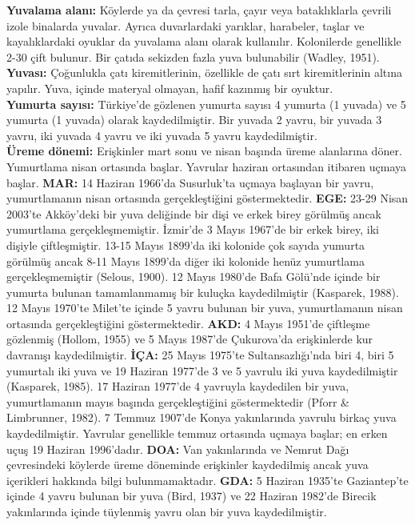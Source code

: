 \documentclass[
  10.5pt,
  a4paper,
  DIV=11,
  numbers=noendperiod,
  twocolumn]{scrreprt}
\begin{document}
\textbf{Yuvalama alanı:} Köylerde ya da çevresi tarla, çayır veya
bataklıklarla çevrili izole binalarda yuvalar. Ayrıca duvarlardaki
yarıklar, harabeler, taşlar ve kayalıklardaki oyuklar da yuvalama alanı
olarak kullanılır. Kolonilerde genellikle 2-30 çift bulunur. Bir çatıda
sekizden fazla yuva bulunabilir (Wadley, 1951).\\
\textbf{Yuvası:} Çoğunlukla çatı kiremitlerinin, özellikle de çatı sırt
kiremitlerinin altına yapılır. Yuva, içinde materyal olmayan, hafif
kazınmış bir oyuktur.\\
\textbf{Yumurta sayısı:} Türkiye'de gözlenen yumurta sayısı 4 yumurta (1
yuvada) ve 5 yumurta (1 yuvada) olarak kaydedilmiştir. Bir yuvada 2
yavru, bir yuvada 3 yavru, iki yuvada 4 yavru ve iki yuvada 5 yavru
kaydedilmiştir.\\
\textbf{Üreme dönemi:} Erişkinler mart sonu ve nisan başında üreme
alanlarına döner. Yumurtlama nisan ortasında başlar. Yavrular haziran
ortasından itibaren uçmaya başlar. \textbf{MAR:} 14 Haziran 1966'da
Susurluk'ta uçmaya başlayan bir yavru, yumurtlamanın nisan ortasında
gerçekleştiğini göstermektedir. \textbf{EGE:} 23-29 Nisan 2003'te
Akköy'deki bir yuva deliğinde bir dişi ve erkek birey görülmüş ancak
yumurtlama gerçekleşmemiştir. İzmir'de 3 Mayıs 1967'de bir erkek birey,
iki dişiyle çiftleşmiştir. 13-15 Mayıs 1899'da iki kolonide çok sayıda
yumurta görülmüş ancak 8-11 Mayıs 1899'da diğer iki kolonide henüz
yumurtlama gerçekleşmemiştir (Selous, 1900). 12 Mayıs 1980'de Bafa
Gölü'nde içinde bir yumurta bulunan tamamlanmamış bir kuluçka
kaydedilmiştir (Kasparek, 1988). 12 Mayıs 1970'te Milet'te içinde 5
yavru bulunan bir yuva, yumurtlamanın nisan ortasında gerçekleştiğini
göstermektedir. \textbf{AKD:} 4 Mayıs 1951'de çiftleşme gözlenmiş
(Hollom, 1955) ve 5 Mayıs 1987'de Çukurova'da erişkinlerde kur davranışı
kaydedilmiştir. \textbf{İÇA:} 25 Mayıs 1975'te Sultansazlığı'nda biri 4,
biri 5 yumurtalı iki yuva ve 19 Haziran 1977'de 3 ve 5 yavrulu iki yuva
kaydedilmiştir (Kasparek, 1985). 17 Haziran 1977'de 4 yavruyla
kaydedilen bir yuva, yumurtlamanın mayıs başında gerçekleştiğini
göstermektedir (Pforr \& Limbrunner, 1982). 7 Temmuz 1907'de Konya
yakınlarında yavrulu birkaç yuva kaydedilmiştir. Yavrular genellikle
temmuz ortasında uçmaya başlar; en erken uçuş 19 Haziran 1996'dadır.
\textbf{DOA:} Van yakınlarında ve Nemrut Dağı çevresindeki köylerde
üreme döneminde erişkinler kaydedilmiş ancak yuva içerikleri hakkında
bilgi bulunmamaktadır. \textbf{GDA:} 5 Haziran 1935'te Gaziantep'te
içinde 4 yavru bulunan bir yuva (Bird, 1937) ve 22 Haziran 1982'de
Birecik yakınlarında içinde tüylenmiş yavru olan bir yuva
kaydedilmiştir.
\end{document}
